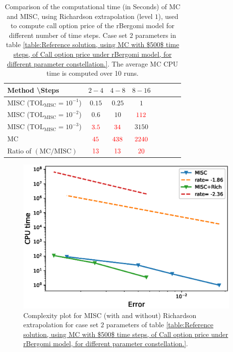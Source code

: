 \begin{table}[h!]
	\centering
	\begin{tabular}{l*{6}{c}r}
		Method \textbackslash  Steps            & $2-4$ & $4-8$ & $8-16$ &   \\
		\hline
		MISC ($\text{TOL}_{\text{MISC}}=10^{-1}$)   & $0.15$ & $0.25$ & $1$  \\
		MISC ($\text{TOL}_{\text{MISC}}=10^{-2}$)   & $0.6$ & $10$ & ${\color{red}112}$  \\
		MISC ($\text{TOL}_{\text{MISC}}=10^{-3}$)  & ${\color{red}3.5}$ & ${\color{red}34}$ & $3150$ \\
		\hline	
			MC  & ${\color{red}45}$  & ${\color{red}438}$  & ${\color{red}2240}$ \\
			
			\hline
				Ratio of $\left(\text{MC}/ \text{MISC} \right)$   & ${\color{red}13}$  & ${\color{red}13}$  & ${\color{red}20}$ \\

		\hline
	\end{tabular}
	\caption{Comparison of the computational time (in Seconds) of  MC and MISC, using Richardson extrapolation (level $1$), used to compute call option price of the rBergomi model for different number of time steps. Case set $2$ parameters in table \ref{table:Reference solution, using MC with $500$ time steps, of Call option price under rBergomi model, for different parameter constellation.}. The
average MC CPU time is computed over 10 runs.}
	\label{Comparsion of the computational time of  MC and MISC, using Richardson extrapolation (level $1$), used to compute Call option price of rBergomi model for different number of time steps. Case set $3$ parameters}
\end{table}

\FloatBarrier


	\begin{figure}[h!]
	\centering
	\includegraphics[width=0.35\linewidth]{./figures/rBergomi_Complexity_rates/set5/error_vs_time_set5_comparison}
	
	\caption{Complexity plot for  MISC (with and without) Richardson extrapolation for case set $2$ parameters of table \ref{table:Reference solution, using MC with $500$ time steps, of Call option price under rBergomi model, for different parameter constellation.}.}
	\label{fig:Complexity plot for  MISC for case set $3$ parameters, comparison}
\end{figure}


